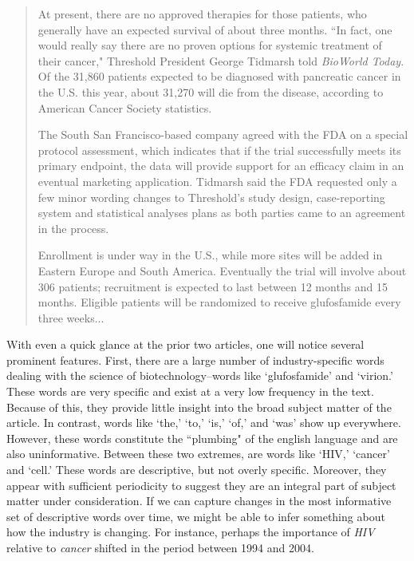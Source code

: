 \begin{singlespace}
\begin{small}
\begin{quotation}
At present, there are no approved therapies for those patients, who generally have an expected survival of about three months. ``In fact, one would really say there are no proven options for systemic treatment of their cancer," Threshold President George Tidmarsh told \emph{BioWorld Today}. Of the 31,860 patients expected to be diagnosed with pancreatic cancer in the U.S. this year, about 31,270 will die from the disease, according to American Cancer Society statistics.

The South San Francisco-based company agreed with the FDA on a special protocol assessment, which indicates that if the trial successfully meets its primary endpoint, the data will provide support for an efficacy claim in an eventual marketing application. Tidmarsh said the FDA requested only a few minor wording changes to Threshold's study design, case-reporting system and statistical analyses plans as both parties came to an agreement in the process.

Enrollment is under way in the U.S., while more sites will be added in Eastern Europe and South America. Eventually the trial will involve about 306 patients; recruitment is expected to last between 12 months and 15 months. Eligible patients will be randomized to receive glufosfamide every three weeks...
\end{quotation}
\end{small}
\end{singlespace}

With even a quick glance at the prior two articles, one will notice several prominent features. First, there are a large number of industry-specific words dealing with the science of biotechnology--words like `glufosfamide' and `virion.' These words are very specific and exist at a very low frequency in the text. Because of this, they provide little insight into the broad subject matter of the article. In contrast, words like `the,' `to,' `is,' `of,' and `was' show up everywhere. However, these words constitute the ``plumbing" of the english language and are also uninformative. Between these two extremes, are words like `HIV,' `cancer' and `cell.' These words are descriptive, but not overly specific. Moreover, they appear with sufficient periodicity to suggest they are an integral part of subject matter under consideration. If we can capture changes in the most informative set of descriptive words over time, we might be able to infer something about how the industry is changing. For instance, perhaps the importance of \emph{HIV} relative to \emph{cancer} shifted in the period between 1994 and 2004.

